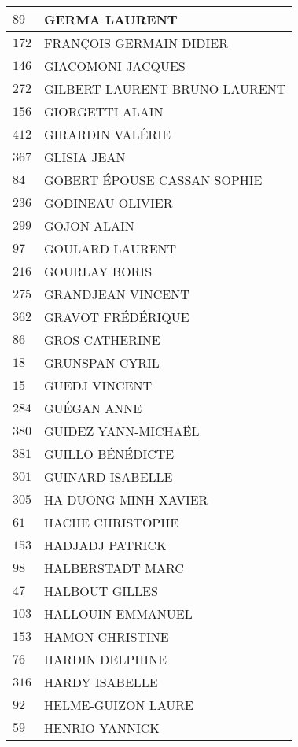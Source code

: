 \begin{xltabular}{\linewidth}{|l|X|}
    \hline
    $89$ & GERMA LAURENT \\
    \hline
    $172$ & FRANÇOIS GERMAIN DIDIER \\
    \hline
    $146$ & GIACOMONI JACQUES \\
    \hline
    $272$ & GILBERT LAURENT BRUNO LAURENT \\
    \hline
    $156$ & GIORGETTI ALAIN \\
    \hline
    $412$ & GIRARDIN VALÉRIE \\
    \hline
    $367$ & GLISIA JEAN \\
    \hline
    $84$ & GOBERT ÉPOUSE CASSAN SOPHIE \\
    \hline
    $236$ & GODINEAU OLIVIER \\
    \hline
    $299$ & GOJON ALAIN \\
    \hline
    $97$ & GOULARD LAURENT \\
    \hline
    $216$ & GOURLAY BORIS \\
    \hline
    $275$ & GRANDJEAN VINCENT \\
    \hline
    $362$ & GRAVOT FRÉDÉRIQUE \\
    \hline
    $86$ & GROS CATHERINE \\
    \hline
    $18$ & GRUNSPAN CYRIL \\
    \hline
    $15$ & GUEDJ VINCENT \\
    \hline
    $284$ & GUÉGAN ANNE \\
    \hline
    $380$ & GUIDEZ YANN-MICHAËL \\
    \hline
    $381$ & GUILLO BÉNÉDICTE \\
    \hline
    $301$ & GUINARD ISABELLE \\
    \hline
    $305$ & HA DUONG MINH XAVIER \\
    \hline
    $61$ & HACHE CHRISTOPHE \\
    \hline
    $153$ & HADJADJ PATRICK \\
    \hline
    $98$ & HALBERSTADT MARC \\
    \hline
    $47$ & HALBOUT GILLES \\
    \hline
    $103$ & HALLOUIN EMMANUEL \\
    \hline
    $153$ & HAMON CHRISTINE \\
    \hline
    $76$ & HARDIN DELPHINE \\
    \hline
    $316$ & HARDY ISABELLE \\
    \hline
    $92$ & HELME-GUIZON LAURE \\
    \hline
    $59$ & HENRIO YANNICK \\

\end{xltabular}
